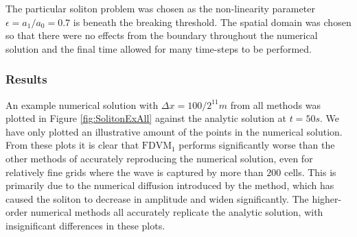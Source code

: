 The particular soliton problem was chosen as the non-linearity parameter $\epsilon = a_1 / a_0 = 0.7$ is beneath the breaking threshold. The spatial domain was chosen so that there were no effects from the boundary throughout the numerical solution and the final time allowed for many time-steps to be performed. 

\subsubsection{Results}
An example numerical solution with $\Delta x = {100} / {2^{11}}m$ from all methods was plotted in Figure \ref{fig:SolitonExAll} against the analytic solution at $t= 50s$. We have only plotted an illustrative amount of the points in the numerical solution. From these plots it is clear that $\text{FDVM}_1$ performs significantly worse than the other methods of accurately reproducing the numerical solution, even for relatively fine grids where the wave is captured by more than $200$ cells. This is primarily due to the numerical diffusion introduced by the method, which has caused the soliton to decrease in amplitude and widen significantly. The higher-order numerical methods all accurately replicate the analytic solution, with insignificant differences in these plots.

